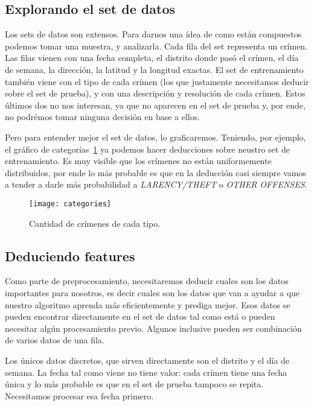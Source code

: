 \subsection{Explorando el set de datos} %
\label{sub:explorando_el_set_de_datos}

Los sets de datos son extensos. Para darnos una ídea de como están compuestos podemos tomar una muestra, y analizarla. Cada fila del set representa un crímen. Las filas vienen con una fecha completa, el distrito donde pasó el crímen, el día de semana, la dirección, la latitud y la longitud exactas. El set de entrenamiento también viene con el tipo de cada crímen (los que justamente necesitamos deducir sobre el set de prueba), y con una descripción y resolución de cada crímen. Estos últimos dos no nos interesan, ya que no aparecen en el set de prueba y, por ende, no podrémos tomar ninguna decisión en base a ellos.

Pero para entender mejor el set de datos, lo graficaremos. Teniendo, por ejemplo, el gráfico de categorías~\ref{fig:categories} ya podemos hacer deducciones sobre neustro set de entrenamiento. Es muy visible que los crímenes no están uniformemente distribuidos, por ende lo más probable es que en la deducción casi siempre vamos a tender a darle más probabilidad a \textit{LARENCY/THEFT} o \textit{OTHER OFFENSES}.

\begin{figure}[H]
\texttt{[image: categories]}
\caption{Cantidad de crímenes de cada tipo.}
\label{fig:categories}
\end{figure}


\subsection{Deduciendo features} %
\label{sub:deduciendo_features}

Como parte de preprocesamiento, necesitaremos deducir cuales son los datos importantes para nosotros, es decir cuales son los datos que van a ayudar a que nuestro algoritmo aprenda más eficientemente y prediga mejor. Esos datos se pueden encontrar directamente en el set de datos tal como está o pueden necesitar algún procesamiento previo. Algunos inclusive pueden ser combinación de varios datos de una fila.

Los únicos datos discretos, que sirven directamente son el distrito y el día de semana. La fecha tal como viene no tiene valor: cada crímen tiene una fecha única y lo más probable es que en el set de prueba tampoco se repita. Necesitamos procesar esa fecha primero.

